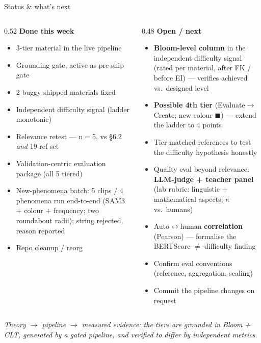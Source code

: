\documentclass[aspectratio=169,10pt]{beamer}
\newcommand{\ok}{{\color{cApp}\textbf{\checkmark}}}
\begin{document}
\begin{frame}{Status \& what's next}
\small
\begin{columns}[T]
\begin{column}{0.52\textwidth}
\textbf{\color{cApp}Done this week}
\begin{itemize}\setlength\itemsep{1pt}\small
  \item 3-tier material in the live pipeline \ok
  \item Grounding gate, active as pre-ship gate \ok
  \item 2 buggy shipped materials fixed \ok
  \item Independent difficulty signal (ladder monotonic) \ok
  \item Relevance retest --- n$=$5, vs §6.2 \emph{and} 19-ref set \ok
  \item Validation-centric evaluation package (all 5 tiered) \ok
  \item New-phenomena batch: 5 clips / 4 phenomena run end-to-end (SAM3 $+$ colour $+$ frequency; two roundabout radii); string rejected, reason reported \ok
  \item Repo cleanup / reorg \ok
\end{itemize}
\end{column}
\begin{column}{0.48\textwidth}
\textbf{\color{cAccent}Open / next}
\begin{itemize}\setlength\itemsep{1pt}\small
  \item \textbf{Bloom-level column} in the independent difficulty signal (rated per
        material, after FK / before EI) --- verifies achieved vs.\ designed level
  \item \textbf{Possible 4th tier} (Evaluate$\rightarrow$Create; new colour
        \textcolor{cExp}{$\blacksquare$}) --- extend the ladder to 4 points
  \item Tier-matched references to test the difficulty hypothesis honestly
  \item Quality eval beyond relevance: \textbf{LLM-judge + teacher panel}
        (lab rubric: linguistic + mathematical aspects; $\kappa$ vs.\ humans)
  \item Auto$\leftrightarrow$human \textbf{correlation} (Pearson) --- formalise the
        BERTScore-$\neq$-difficulty finding
  \item Confirm eval conventions (reference, aggregation, scaling)
  \item Commit the pipeline changes on request
\end{itemize}
\end{column}
\end{columns}
\vspace{0.6em}
\begin{center}
{\footnotesize\itshape Theory $\rightarrow$ pipeline $\rightarrow$ measured evidence: the tiers are
grounded in Bloom + CLT, generated by a gated pipeline, and verified to differ by independent metrics.}
\end{center}
\end{frame}
\end{document}
